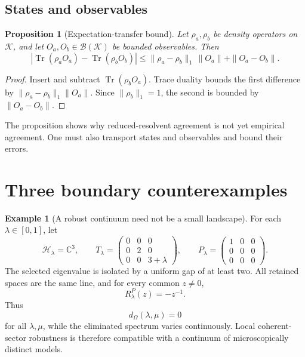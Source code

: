 \documentclass[11pt]{article}
\newtheorem{proposition}[theorem]{Proposition}
\theoremstyle{definition}
\newtheorem{example}[theorem]{Example}
\theoremstyle{remark}
\newcommand{\cH}{\mathcal H}
\newcommand{\cK}{\mathcal K}
\newcommand{\CC}{\mathbb C}
\newcommand{\1}{\mathbf 1}
\newcommand{\Tr}{\operatorname{Tr}}
\begin{document}
\subsection{States and observables}

\begin{proposition}[Expectation-transfer bound]
\label{prop:observable}
Let \(\rho_a,\rho_b\) be density operators on \(\cK\), and let
\(O_a,O_b\in\mathcal B(\cK)\) be bounded observables.  Then
\[
\left|
\Tr(\rho_aO_a)-\Tr(\rho_bO_b)
\right|
\leq
\|\rho_a-\rho_b\|_1\,\|O_a\|
+
\|O_a-O_b\|.
\]
\end{proposition}

\begin{proof}
Insert and subtract \(\Tr(\rho_bO_a)\).  Trace duality bounds the first
difference by
\(\|\rho_a-\rho_b\|_1\|O_a\|\).  Since
\(\|\rho_b\|_1=1\), the second is bounded by
\(\|O_a-O_b\|\).
\end{proof}

The proposition shows why reduced-resolvent agreement is not yet empirical
agreement.  One must also transport states and observables and bound their
errors.

\section{Three boundary counterexamples}
\label{sec:counterexamples}

\begin{example}[A robust continuum need not be a small landscape]
\label{ex:continuum}
For each \(\lambda\in[0,1]\), let
\[
 \cH_\lambda=\CC^3,
 \qquad
 T_\lambda=
 \begin{pmatrix}
 0&0&0\\
 0&2&0\\
 0&0&3+\lambda
 \end{pmatrix},
 \qquad
 P_\lambda=
 \begin{pmatrix}
 1&0&0\\
 0&0&0\\
 0&0&0
 \end{pmatrix}.
\]
The selected eigenvalue is isolated by a uniform gap of at least two.
All retained spaces are the same line, and for every common
\(z\neq0\),
\[
 R_\lambda^P(z)=-z^{-1}.
\]
Thus
\[
 d_\Omega(\lambda,\mu)=0
\]
for all \(\lambda,\mu\), while the eliminated spectrum varies continuously.
Local coherent-sector robustness is therefore compatible with a continuum
of microscopically distinct models.
\end{example}
\end{document}
